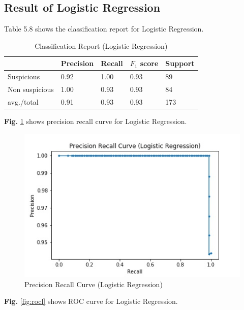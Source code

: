 
\subsection{Result of Logistic Regression}
Table 5.8 shows the classification report for Logistic Regression.

\begin{table}[h!]
\begin{center}
\caption{Classification Report (Logistic Regression)}
\begin{tabular}{|m{4.4cm} | m{2cm}| m{2cm}| m{2cm}| m{2cm}|}
\hline
     & Precision & Recall & $F_1$ score & Support \\
\hline
     Suspicious & 0.92 & 1.00 & 0.93 & 89\\
\hline 
     Non suspicious  & 1.00 & 0.93 & 0.93 & 84\\
\hline 
     avg./total & 0.91 & 0.93 & 0.93 & 173\\
\hline
\end{tabular}
\end{center}
\end{table}

\noindent
\textbf{Fig.} \ref{fig:prl} shows precision recall curve for Logistic Regression.

\begin{figure}[h!]
    \centering
    \includegraphics[scale=0.58]{Figures/PRL.jpg}
    \caption{Precision Recall Curve (Logistic Regression)}
    \label{fig:prl}
\end{figure}

\noindent
\textbf{Fig.} \ref{fig:rocl} shows ROC curve for Logistic Regression.

